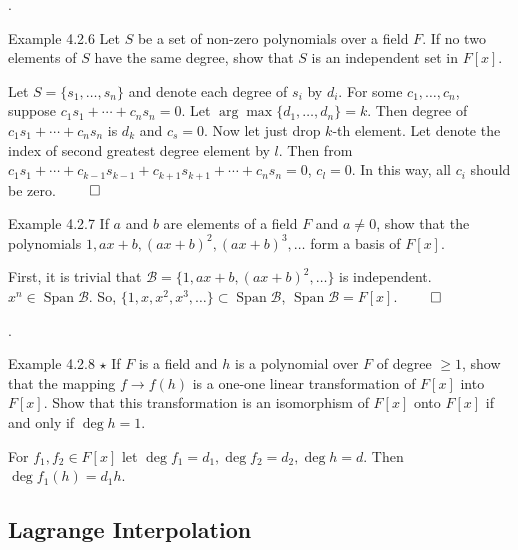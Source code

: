 \documentclass[8pt]{beamer}
\newcommand{\mc}[1]{\mathcal{#1}}
\newcommand{\Span}{\operatorname{Span}}
\begin{document}
\begin{frame}{.}
    \begin{block}{Example 4.2.6}
        Let $S$ be a set of non-zero polynomials over a field $F$.
        If no two elements of $S$ have the same degree, show that $S$ is an independent set in $F[x]$.
    \end{block}
    Let $S =\{s_1, \dots , s_n \}$ and denote each degree of $s_i$ by $d_i$.
    For some $c_1, \dots, c_n$, suppose $c_1 s_1 + \cdots + c_n s_n = 0$.
    Let $\arg \max \{d_1, \dots, d_n\} = k$.
    Then degree of $c_1 s_1 + \cdots + c_n s_n$ is $d_k$ and $c_s = 0$.
    Now let just drop $k$-th element.
    Let denote the index of second greatest degree element by $l$.
    Then from $c_1 s_1 + \cdots +c_{k-1} s_{k-1} + c_{k+1} s_{k+1} + \cdots + c_n s_n=0$, $c_l = 0$.
    In this way, all $c_i$ should be zero.
    $\qed$

    \begin{block}{Example 4.2.7}
        If $a$ and $b$ are elements of a field $F$ and $a \neq 0$, show that the polynomials $1, ax+b, (ax+b)^2, (ax+b)^3, \dots$ form a basis of $F[x]$.
    \end{block}

    First, it is trivial that $\mc{B} = \{1, ax+b, (ax+b)^2, \dots \}$ is independent.
    $x^n \in \Span \mc{B}$.
    So, $\{1, x, x^2, x^3, \dots\} \subset \Span \mc{B}$, $\Span \mc{B} =F[x]$.
    $\qed$
\end{frame}

\begin{frame}{.}
    \begin{block}{Example 4.2.8 $\star$}
        If $F$ is a field and $h$ is a polynomial over $F$ of degree $\geq 1$, show that the mapping $f \to f(h)$ is a one-one linear transformation of $F[x]$ into $F[x]$.
        Show that this transformation is an isomorphism of $F[x]$ onto $F[x]$ if and only if $\deg h = 1$.
    \end{block}

    For $f_1, f_2 \in F[x]$ let $\deg f_1 = d_1, \deg f_2 = d_2, \deg h = d$.
    Then $\deg f_1(h) = d_1 h$.
\end{frame}



\subsection{Lagrange Interpolation}
\end{document}
